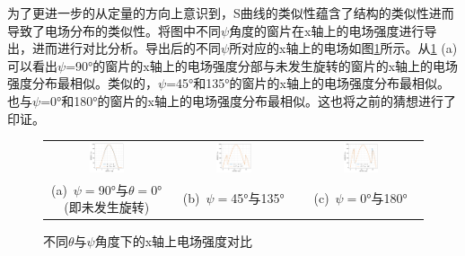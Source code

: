 \documentclass[master]{thesis-uestc}
\begin{document}
为了更进一步的从定量的方向上意识到，S曲线的类似性蕴含了结构的类似性进而导致了电场分布的类似性。将图中不同\(\psi\)角度的窗片在x轴上的电场强度进行导出，进而进行对比分析。导出后的不同\(\psi\)所对应的x轴上的电场如图\ref{fig:X轴上电场强度对比}所示。从\ref{fig:X轴上电场强度对比} (a)可以看出\(\psi\)=90°的窗片的x轴上的电场强度分部与未发生旋转的窗片的x轴上的电场强度分布最相似。类似的，\(\psi\)=45°和135°的窗片的x轴上的电场强度分布最相似。也与\(\psi\)=0°和180°的窗片的x轴上的电场强度分布最相似。这也将之前的猜想进行了印证。
\begin{figure}[!htb]
    \small
    \centering
    \begin{tabular}{@{\ }c@{\ }c@{\ }c}
        \includegraphics[width=0.3\textwidth]{pic/chapter5/XTHETA0PSI90.png} & 
        \hspace{5pt}
        \includegraphics[width=0.3\textwidth]{pic/chapter5/XPSI45PSI135.png}&
        \hspace{5pt}
        \includegraphics[width=0.3\textwidth]{pic/chapter5/XPSI0PSI180.png}      \\
        \mbox{\small (a) \(\psi=\)90°与\(\theta=\)0°(即未发生旋转)}                                                                               & 
        \mbox{\small (b) \(\psi=\)45°与135°} & 
        \mbox{\small (c) \(\psi=\)0°与180°}                                                                                  \\
    \end{tabular}
    \caption{不同\(\theta\)与\(\psi\)角度下的x轴上电场强度对比}
    \label{fig:X轴上电场强度对比}
\end{figure}
\end{document}
